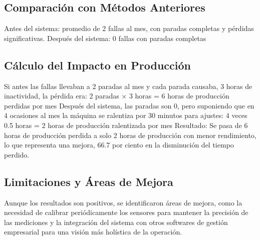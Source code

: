 \subsection{Comparación con Métodos Anteriores}
Antes del sistema: promedio de 2 fallas al mes, con paradas completas y pérdidas significativas.
Después del sistema: 0 fallas con paradas completas
\subsection{Cálculo del Impacto en Producción}
Si antes las fallas llevaban a 2 paradas al mes y cada parada causaba, 3 horas de inactividad, la pérdida era:
2 paradas × 3 horas = 6 horas de producción perdidas por mes 
Después del sistema, las paradas son 0, pero suponiendo que en 4 ocasiones al mes la máquina se ralentiza por 30 minutos para ajustes:
4 veces 0.5 horas = 2 horas de producción ralentizada por mes
Resultado: Se pasa de 6 horas de producción perdida a solo 2 horas de producción con menor rendimiento, lo que representa una mejora, 66.7 por ciento en la disminución del tiempo perdido.
\subsection{Limitaciones y Áreas de Mejora}
Aunque los resultados son positivos, se identificaron áreas de mejora, como la necesidad de calibrar periódicamente los sensores para mantener la precisión de las mediciones y la integración del sistema con otros softwares de gestión empresarial para una visión más holística de la operación.

